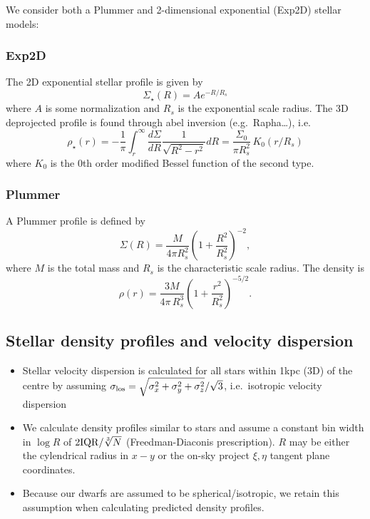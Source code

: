 We consider both a Plummer and 2-dimensional exponential (Exp2D) stellar
models:

\subsubsection{Exp2D}\label{exp2d}

The 2D exponential stellar profile is given by \begin{equation}
\Sigma_\star(R) = A e^{-R / R_s}
\end{equation} where \(A\) is some normalization and \(R_s\) is the
exponential scale radius. The 3D deprojected profile is found through
abel inversion (e.g.~Rapha\ldots), i.e. \begin{equation}
\rho_\star (r) =- \frac{1}{\pi}\int_r^\infty \frac{d\Sigma}{dR} \frac{1}{\sqrt{R^2 - r^2}} dR  = \frac{\Sigma_0}{\pi R_s^2}\,K_0(r/R_s)
\end{equation} where \(K_0\) is the 0th order modified Bessel function
of the second type.

\subsubsection{Plummer}\label{plummer}

A Plummer profile is defined by \begin{equation}
\Sigma(R) = \frac{M}{4\pi R_s^2} \left(1 + \frac{R^2}{R_s^2}\right)^{-2} ,
\end{equation} where \(M\) is the total mass and \(R_s\) is the
characteristic scale radius. The density is \begin{equation}
\rho(r) = \frac{3M}{4\pi\,R_s^3} \left(1 + \frac{r^2}{R_s^2}\right)^{-5/2}.
\end{equation}

\subsection{Stellar density profiles and velocity
dispersion}\label{stellar-density-profiles-and-velocity-dispersion}

\begin{itemize}
\tightlist
\item
  Stellar velocity dispersion is calculated for all stars within 1kpc
  (3D) of the centre by assuming
  \(\sigma_{\rm los} = \sqrt{\sigma_x^2 + \sigma_y^2 + \sigma_z^2}/ \sqrt 3\),
  i.e.~isotropic velocity dispersion
\item
  We calculate density profiles similar to stars and assume a constant
  bin width in \(\log R\) of \(2 {\rm IQR} / \sqrt[3]{N}\)
  (Freedman-Diaconis prescription). \(R\) may be either the cylendrical
  radius in \(x-y\) or the on-sky project \(\xi, \eta\) tangent plane
  coordinates.
\item
  Because our dwarfs are assumed to be spherical/isotropic, we retain
  this assumption when calculating predicted density profiles.
\end{itemize}
